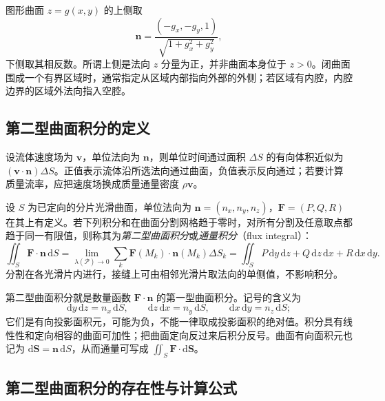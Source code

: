 图形曲面 $z=g(x,y)$ 的上侧取
\[
    \boldsymbol n=\frac{(-g_x,-g_y,1)}{\sqrt{1+g_x^2+g_y^2}},
\]
下侧取其相反数。所谓上侧是法向 $z$ 分量为正，并非曲面本身位于 $z>0$。闭曲面围成一个有界区域时，通常指定从区域内部指向外部的外侧；若区域有内腔，内腔边界的区域外法向指入空腔。

\subsection{第二型曲面积分的定义}
\label{subsec:definition-of-surface-integrals-of-the-second-kind}

设流体速度场为 $\boldsymbol v$，单位法向为 $\boldsymbol n$，则单位时间通过面积 $\Delta S$ 的有向体积近似为 $(\boldsymbol v\cdot\boldsymbol n)\Delta S$。正值表示流体沿所选法向通过曲面，负值表示反向通过；若要计算质量流率，应把速度场换成质量通量密度 $\rho\boldsymbol v$。

\begin{definition}
\label{def:surface-integral-second-kind}
设 $S$ 为已定向的分片光滑曲面，单位法向为 $\boldsymbol n=(n_x,n_y,n_z)$，$\boldsymbol F=(P,Q,R)$ 在其上有定义。若下列积分和在曲面分割网格趋于零时，对所有分割及任意取点都趋于同一有限值，则称其为\emph{第二型曲面积分}或\emph{通量积分}（flux integral）：
\begin{equation}
\label{eq:second-surface-integral-definition}
    \iint_S\boldsymbol F\cdot\boldsymbol n\,\mathrm dS
    =\lim_{\lambda(\mathcal P)\to0}
      \sum_k\boldsymbol F(M_k)\cdot\boldsymbol n(M_k)\Delta S_k
    =\iint_S P\,\mathrm dy\,\mathrm dz+Q\,\mathrm dz\,\mathrm dx+R\,\mathrm dx\,\mathrm dy.
\end{equation}
分割在各光滑片内进行，接缝上可由相邻光滑片取法向的单侧值，不影响积分。
\end{definition}

第二型曲面积分就是数量函数 $\boldsymbol F\cdot\boldsymbol n$ 的第一型曲面积分。记号的含义为
\begin{equation}
\label{eq:oriented-surface-elements}
    \mathrm dy\,\mathrm dz=n_x\,\mathrm dS,\qquad
    \mathrm dz\,\mathrm dx=n_y\,\mathrm dS,\qquad
    \mathrm dx\,\mathrm dy=n_z\,\mathrm dS;
\end{equation}
它们是有向投影面积元，可能为负，不能一律取成投影面积的绝对值。积分具有线性性和定向相容的曲面可加性；把曲面定向反过来后积分反号。曲面有向面积元也记为 $\mathrm d\boldsymbol S=\boldsymbol n\,\mathrm dS$，从而通量可写成 $\iint_S\boldsymbol F\cdot\mathrm d\boldsymbol S$。

\subsection{第二型曲面积分的存在性与计算公式}
\label{subsec:existence-and-evaluation-of-surface-integrals-of-the-second-kind}

